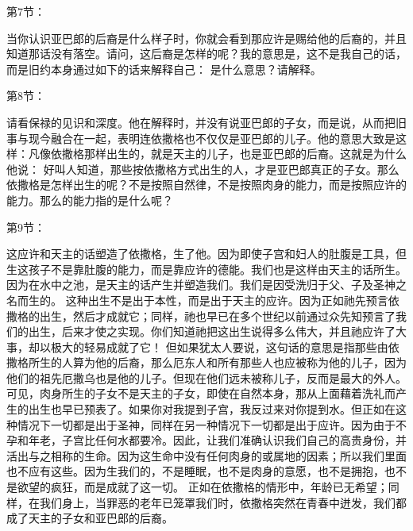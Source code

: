 第7节：\par

当你认识亚巴郎的后裔是什么样子时，你就会看到那应许是赐给他的后裔的，并且知道那话没有落空。请问，这后裔是怎样的呢？我的意思是，这不是我自己的话，而是旧约本身通过如下的话来解释自己： 是什么意思？请解释。\par

第8节：\par

请看保禄的见识和深度。他在解释时，并没有说亚巴郎的子女，而是说，从而把旧事与现今融合在一起，表明连依撒格也不仅仅是亚巴郎的儿子。他的意思大致是这样：凡像依撒格那样出生的，就是天主的儿子，也是亚巴郎的后裔。这就是为什么他说： 好叫人知道，那些按依撒格方式出生的人，才是亚巴郎真正的子女。那么依撒格是怎样出生的呢？不是按照自然律，不是按照肉身的能力，而是按照应许的能力。那么的能力指的是什么呢？\par

第9节：\par

这应许和天主的话塑造了依撒格，生了他。因为即使子宫和妇人的肚腹是工具，但生这孩子不是靠肚腹的能力，而是靠应许的德能。我们也是这样由天主的话所生。因为在水中之池，是天主的话产生并塑造我们。我们是因受洗归于父、子及圣神之名而生的。 这种出生不是出于本性，而是出于天主的应许。因为正如祂先预言依撒格的出生，然后才成就它；同样，祂也早已在多个世纪以前通过众先知预言了我们的出生，后来才使之实现。你们知道祂把这出生说得多么伟大，并且祂应许了大事，却以极大的轻易成就了它！ 但如果犹太人要说，这句话的意思是指那些由依撒格所生的人算为他的后裔，那么厄东人和所有那些人也应被称为他的儿子，因为他们的祖先厄撒乌也是他的儿子。但现在他们远未被称儿子，反而是最大的外人。可见，肉身所生的子女不是天主的子女，即使在自然本身，那从上面藉着洗礼而产生的出生也早已预表了。如果你对我提到子宫，我反过来对你提到水。但正如在这种情况下一切都是出于圣神，同样在另一种情况下一切都是出于应许。因为由于不孕和年老，子宫比任何水都要冷。因此，让我们准确认识我们自己的高贵身份，并活出与之相称的生命。因为这生命中没有任何肉身的或属地的因素；所以我们里面也不应有这些。因为生我们的，不是睡眠，也不是肉身的意愿，也不是拥抱，也不是欲望的疯狂，而是成就了这一切。 正如在依撒格的情形中，年龄已无希望；同样，在我们身上，当罪恶的老年已笼罩我们时，依撒格突然在青春中迸发，我们都成了天主的子女和亚巴郎的后裔。\par

